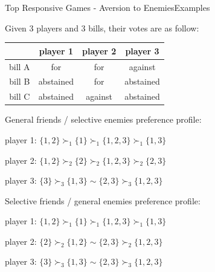 \documentclass[xcolor=dvipsnames]{beamer}
\begin{document}
\begin{frame}{Top Responsive Games - Aversion to Enemies}{Examples}

\begin{example} %
  \small
  Given 3 players and 3 bills, their votes are as follow:

  \begin{table}[ht]
  \centering
  \begin{tabular}{|c|c|c|c|}
  \hline
         & player 1  & player 2 & player 3 \\ \hline
  bill A & for       & for      & against \\
  bill B & abstained & for      & abstained \\
  bill C & abstained & against  & abstained \\
  \hline
  \end{tabular}
  \end{table}

\end{example}

\small
\alert{General friends / selective enemies} preference profile:

player 1: $\{1, 2\} \succ_1 \{1\} \succ_1 \{1, 2, 3\} \succ_1 \{1, 3\} $

player 2: $\{1, 2\} \succ_2 \{2\} \succ_2 \{1, 2, 3\} \succ_2 \{2, 3\}$

player 3: $\{3\} \succ_3 \{1, 3\} \sim \{2, 3\} \succ_3 \{1, 2, 3\}$

\alert{Selective friends / general enemies} preference profile:

player 1: $\{1, 2\} \succ_1 \{1\} \succ_1 \{1, 2, 3\} \succ_1 \{1, 3\} $

player 2: $\{2\} \succ_2 \{1, 2\} \sim \{2, 3\} \succ_2 \{1, 2, 3\} $

player 3: $\{3\} \succ_3 \{1, 3\} \sim \{2, 3\} \succ_3 \{1, 2, 3\}$


\end{frame}
\end{document}
